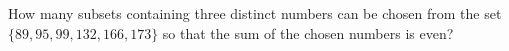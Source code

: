 How many subsets containing three distinct numbers can be chosen from the set $\{89, 95, 99, 132, 166, 173\}$ so that the sum of the chosen numbers is even?
